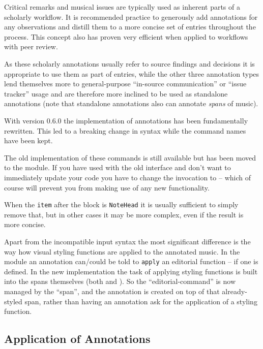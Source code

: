 \documentclass[]{ollmanual}
\begin{document}
Critical remarks and musical issues are typically used as inherent parts
of a scholarly workflow. It is recommended practice to generously add
 annotations for any observations and distill them to
a more concise set of  entries throughout the
process. This concept also has proven very efficient when applied to
workflows with peer review.

As these scholarly annotations usually refer to source findings and
decisions it is appropriate to use them as part of 
entries, while the other three annotation types lend themselves more to
general-purpose ``in-source communication'' or ``issue tracker'' usage
and are therefore more inclined to be used as standalone annotations
(note that standalone annotations also can annotate \emph{spans} of
music).


With  version 0.6.0 the implementation of
annotations has been fundamentally rewritten. This led to a breaking
change in syntax while the command names have been kept.

The old implementation of these commands is still available but has been
moved to the  module. If you have
used  with the old interface and don't want to
immediately update your code you have to change the 
invocation to  -- which of
course will prevent you from making use of any new functionality.

When the \texttt{item} after the  block is \texttt{NoteHead}
it is usually sufficient to simply remove that, but in other cases it
may be more complex, even if the result is more concise.

Apart from the incompatible input syntax the most significant difference
is the way how visual styling functions are applied to the annotated
music. In the  module an annotation can/could be told
to \texttt{apply} an editorial function -- if one is defined. In the new
implementation the task of applying styling functions is built into the
spans themselves (both  and ). So the
``editorial-command'' is now managed by the ``span'', and the annotation
is created on top of that already-styled span, rather than having an
annotation ask for the application of a styling function.

\hypertarget{application-of-annotations}{%
\subsection{Application of
Annotations}\label{application-of-annotations}}
\end{document}
